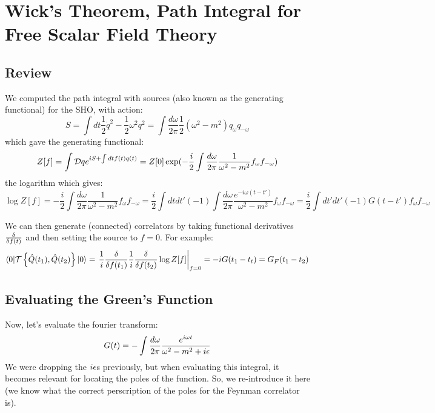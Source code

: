 \section{Wick's Theorem, Path Integral for Free Scalar Field Theory}
\subsection{Review}
We computed the path integral with sources (also known as the generating functional) for the SHO, with action:
\begin{equation}
    S = \int dt \frac{1}{2}\dot{q}^2 - \frac{1}{2}\omega^2q^2 = \int \frac{d\omega}{2\pi}\frac{1}{2}(\omega^2 - m^2)q_\omega q_{-\omega}
\end{equation}
which gave the generating functional:
\begin{equation}
    Z[f] = \int \mathcal{D} q e^{iS + \int dt f(t)q(t)} = Z[0]\exp(-\frac{i}{2}\int \frac{d\omega}{2\pi}\frac{1}{\omega^2 - m^2}f_\omega f_{-\omega})
\end{equation}
the logarithm which gives:
\begin{equation}
    \log Z[f] = -\frac{i}{2}\int \frac{d\omega}{2\pi}\frac{1}{\omega^2 - m^2}f_\omega f_{-\omega} = \frac{i}{2}\int dtdt'(-1)\int \frac{d\omega}{2\pi} \frac{e^{-i\omega(t-t')}}{\omega^2 - m^2} f_\omega f_{-\omega} = \frac{i}{2}\int dt'dt'(-1)G(t-t')f_\omega f_{-\omega}
\end{equation}

We can then generate (connected) correlators by taking functional derivatives $\frac{\delta }{\delta f(t)}$ and then setting the source to $f = 0$. For example:
\begin{equation}
    \langle 0 \rvert\mathcal{T}\set{\hat{Q}(t_1), \hat{Q}(t_2)}\lvert 0 \rangle = \left.\frac{1}{i}\frac{\delta }{\delta f(t_1)}\frac{1}{i}\frac{\delta }{\delta f(t_2)}\log Z[f] \right|_{f=0} = -iG(t_1 - t_t) = G_F(t_1 - t_2)
\end{equation}

\subsection{Evaluating the Green's Function}
Now, let's evaluate the fourier transform:
\begin{equation}
    G(t) = -\int \frac{d\omega}{2\pi}\frac{e^{i\omega t}}{\omega^2 - m^2 + i\epsilon}
\end{equation}
We were dropping the $i\epsilon$s previously, but when evaluating this integral, it becomes relevant for locating the poles of the function. So, we re-introduce it here (we know what the correct perscription of the poles for the Feynman correlator is).

